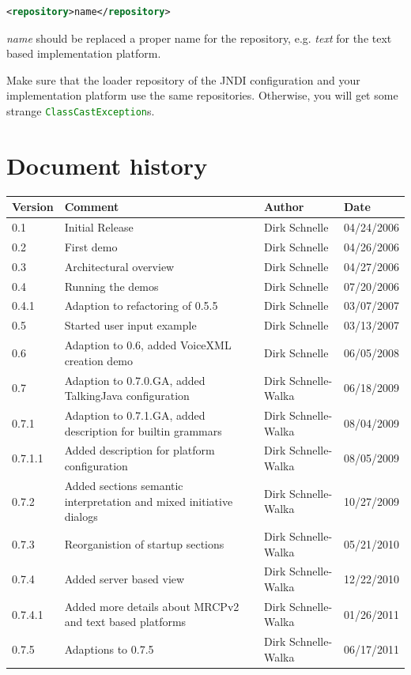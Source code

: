 \documentclass[11pt,a4paper]{article}
\begin{document}
\begin{lstlisting}[language=XML]
<repository>name</repository>
\end{lstlisting}

\emph{name} should be replaced a proper name for the repository, e.g.
\emph{text} for the text based implementation platform.

Make sure that the loader repository of the JNDI configuration and your
implementation platform use the same repositories. Otherwise, you will get some
strange \lstinline[language=Java]{ClassCastException}s.

 \section*{Document history}

\begin{tabular}{|l|p{5cm}|l|l|}
\hline
\textbf{Version} & \textbf{Comment} & \textbf{Author} & \textbf{Date} \\
\hline
\hline
0.1 & Initial Release & Dirk Schnelle & 04/24/2006 \\
\hline
0.2 & First demo & Dirk Schnelle & 04/26/2006 \\
\hline
0.3 & Architectural overview & Dirk Schnelle & 04/27/2006 \\
\hline
0.4 & Running the demos & Dirk Schnelle & 07/20/2006 \\
\hline
0.4.1 & Adaption to refactoring of 0.5.5 & Dirk Schnelle & 03/07/2007 \\
\hline
0.5 & Started user input example & Dirk Schnelle & 03/13/2007 \\
\hline
0.6 & Adaption to 0.6, added VoiceXML creation demo 
    & Dirk Schnelle & 06/05/2008 \\
\hline
0.7 & Adaption to 0.7.0.GA, added TalkingJava configuration 
    & Dirk Schnelle-Walka & 06/18/2009 \\
\hline
0.7.1 & Adaption to 0.7.1.GA, added description for builtin grammars 
    & Dirk Schnelle-Walka & 08/04/2009 \\
\hline
0.7.1.1 & Added description for platform configuration 
    & Dirk Schnelle-Walka & 08/05/2009 \\
\hline
0.7.2 & Added sections semantic interpretation and mixed initiative dialogs 
    & Dirk Schnelle-Walka & 10/27/2009 \\
\hline
0.7.3 & Reorganistion of startup sections 
    & Dirk Schnelle-Walka & 05/21/2010 \\
\hline
0.7.4 & Added server based view 
    & Dirk Schnelle-Walka & 12/22/2010 \\
\hline
0.7.4.1 & Added more details about MRCPv2 and text based platforms 
    & Dirk Schnelle-Walka & 01/26/2011 \\
\hline
0.7.5 & Adaptions to 0.7.5 
    & Dirk Schnelle-Walka & 06/17/2011 \\
\hline
\end{tabular}



\end{document}
